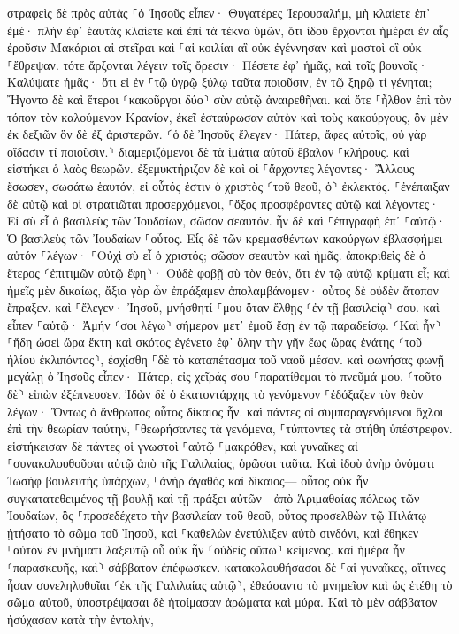 \documentclass[twoside, 9pt]{extreport}
\begin{document}
στραφεὶς δὲ πρὸς αὐτὰς ⸀ὁ Ἰησοῦς εἶπεν· Θυγατέρες Ἰερουσαλήμ, μὴ κλαίετε ἐπ᾽ ἐμέ· πλὴν ἐφ᾽ ἑαυτὰς κλαίετε καὶ ἐπὶ τὰ τέκνα ὑμῶν, 
ὅτι ἰδοὺ ἔρχονται ἡμέραι ἐν αἷς ἐροῦσιν Μακάριαι αἱ στεῖραι καὶ ⸀αἱ κοιλίαι αἳ οὐκ ἐγέννησαν καὶ μαστοὶ οἳ οὐκ ⸀ἔθρεψαν. 
τότε ἄρξονται λέγειν τοῖς ὄρεσιν· Πέσετε ἐφ᾽ ἡμᾶς, καὶ τοῖς βουνοῖς· Καλύψατε ἡμᾶς· 
ὅτι εἰ ἐν ⸀τῷ ὑγρῷ ξύλῳ ταῦτα ποιοῦσιν, ἐν τῷ ξηρῷ τί γένηται; 
Ἤγοντο δὲ καὶ ἕτεροι ⸂κακοῦργοι δύο⸃ σὺν αὐτῷ ἀναιρεθῆναι. 
καὶ ὅτε ⸀ἦλθον ἐπὶ τὸν τόπον τὸν καλούμενον Κρανίον, ἐκεῖ ἐσταύρωσαν αὐτὸν καὶ τοὺς κακούργους, ὃν μὲν ἐκ δεξιῶν ὃν δὲ ἐξ ἀριστερῶν. 
⸂ὁ δὲ Ἰησοῦς ἔλεγεν· Πάτερ, ἄφες αὐτοῖς, οὐ γὰρ οἴδασιν τί ποιοῦσιν.⸃ διαμεριζόμενοι δὲ τὰ ἱμάτια αὐτοῦ ἔβαλον ⸀κλήρους. 
καὶ εἱστήκει ὁ λαὸς θεωρῶν. ἐξεμυκτήριζον δὲ καὶ οἱ ⸀ἄρχοντες λέγοντες· Ἄλλους ἔσωσεν, σωσάτω ἑαυτόν, εἰ οὗτός ἐστιν ὁ χριστὸς ⸂τοῦ θεοῦ, ὁ⸃ ἐκλεκτός. 
⸀ἐνέπαιξαν δὲ αὐτῷ καὶ οἱ στρατιῶται προσερχόμενοι, ⸀ὄξος προσφέροντες αὐτῷ 
καὶ λέγοντες· Εἰ σὺ εἶ ὁ βασιλεὺς τῶν Ἰουδαίων, σῶσον σεαυτόν. 
ἦν δὲ καὶ ⸀ἐπιγραφὴ ἐπ᾽ ⸀αὐτῷ· Ὁ βασιλεὺς τῶν Ἰουδαίων ⸀οὗτος. 
Εἷς δὲ τῶν κρεμασθέντων κακούργων ἐβλασφήμει αὐτόν ⸀λέγων· ⸀Οὐχὶ σὺ εἶ ὁ χριστός; σῶσον σεαυτὸν καὶ ἡμᾶς. 
ἀποκριθεὶς δὲ ὁ ἕτερος ⸂ἐπιτιμῶν αὐτῷ ἔφη⸃· Οὐδὲ φοβῇ σὺ τὸν θεόν, ὅτι ἐν τῷ αὐτῷ κρίματι εἶ; 
καὶ ἡμεῖς μὲν δικαίως, ἄξια γὰρ ὧν ἐπράξαμεν ἀπολαμβάνομεν· οὗτος δὲ οὐδὲν ἄτοπον ἔπραξεν. 
καὶ ⸀ἔλεγεν· Ἰησοῦ, μνήσθητί ⸀μου ὅταν ἔλθῃς ⸂ἐν τῇ βασιλείᾳ⸃ σου. 
καὶ εἶπεν ⸀αὐτῷ· Ἀμήν ⸂σοι λέγω⸃ σήμερον μετ᾽ ἐμοῦ ἔσῃ ἐν τῷ παραδείσῳ. 
⸂Καὶ ἦν⸃ ⸀ἤδη ὡσεὶ ὥρα ἕκτη καὶ σκότος ἐγένετο ἐφ᾽ ὅλην τὴν γῆν ἕως ὥρας ἐνάτης 
⸂τοῦ ἡλίου ἐκλιπόντος⸃, ἐσχίσθη ⸀δὲ τὸ καταπέτασμα τοῦ ναοῦ μέσον. 
καὶ φωνήσας φωνῇ μεγάλῃ ὁ Ἰησοῦς εἶπεν· Πάτερ, εἰς χεῖράς σου ⸀παρατίθεμαι τὸ πνεῦμά μου. ⸂τοῦτο δὲ⸃ εἰπὼν ἐξέπνευσεν. 
Ἰδὼν δὲ ὁ ἑκατοντάρχης τὸ γενόμενον ⸀ἐδόξαζεν τὸν θεὸν λέγων· Ὄντως ὁ ἄνθρωπος οὗτος δίκαιος ἦν. 
καὶ πάντες οἱ συμπαραγενόμενοι ὄχλοι ἐπὶ τὴν θεωρίαν ταύτην, ⸀θεωρήσαντες τὰ γενόμενα, ⸀τύπτοντες τὰ στήθη ὑπέστρεφον. 
εἱστήκεισαν δὲ πάντες οἱ γνωστοὶ ⸀αὐτῷ ⸀μακρόθεν, καὶ γυναῖκες αἱ ⸀συνακολουθοῦσαι αὐτῷ ἀπὸ τῆς Γαλιλαίας, ὁρῶσαι ταῦτα. 
Καὶ ἰδοὺ ἀνὴρ ὀνόματι Ἰωσὴφ βουλευτὴς ὑπάρχων, ⸀ἀνὴρ ἀγαθὸς καὶ δίκαιος— 
οὗτος οὐκ ἦν συγκατατεθειμένος τῇ βουλῇ καὶ τῇ πράξει αὐτῶν—ἀπὸ Ἁριμαθαίας πόλεως τῶν Ἰουδαίων, ὃς ⸀προσεδέχετο τὴν βασιλείαν τοῦ θεοῦ, 
οὗτος προσελθὼν τῷ Πιλάτῳ ᾐτήσατο τὸ σῶμα τοῦ Ἰησοῦ, 
καὶ ⸀καθελὼν ἐνετύλιξεν αὐτὸ σινδόνι, καὶ ἔθηκεν ⸀αὐτὸν ἐν μνήματι λαξευτῷ οὗ οὐκ ἦν ⸂οὐδεὶς οὔπω⸃ κείμενος. 
καὶ ἡμέρα ἦν ⸂παρασκευῆς, καὶ⸃ σάββατον ἐπέφωσκεν. 
κατακολουθήσασαι δὲ ⸀αἱ γυναῖκες, αἵτινες ἦσαν συνεληλυθυῖαι ⸂ἐκ τῆς Γαλιλαίας αὐτῷ⸃, ἐθεάσαντο τὸ μνημεῖον καὶ ὡς ἐτέθη τὸ σῶμα αὐτοῦ, 
ὑποστρέψασαι δὲ ἡτοίμασαν ἀρώματα καὶ μύρα. Καὶ τὸ μὲν σάββατον ἡσύχασαν κατὰ τὴν ἐντολήν, 
\end{document}
